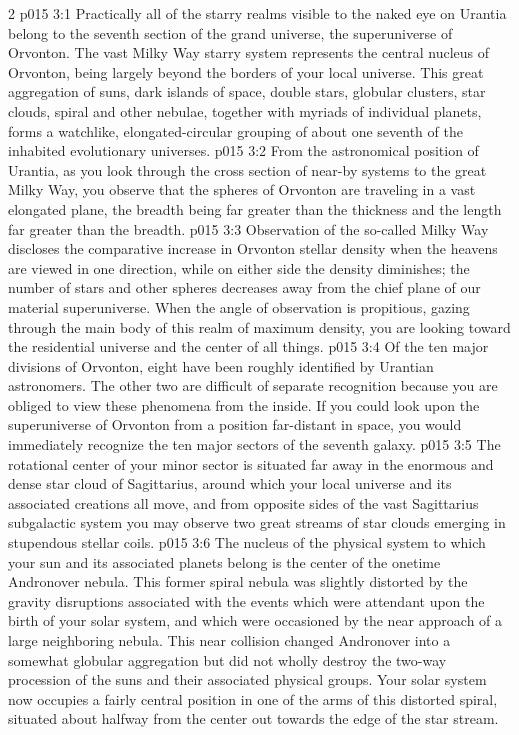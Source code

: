 \begin{multicols}{2}
\vs p015 3:1 Practically all of the starry realms visible to the naked eye on Urantia belong to the seventh section of the grand universe, the superuniverse of Orvonton. The vast Milky Way starry system represents the central nucleus of Orvonton, being largely beyond the borders of your local universe. This great aggregation of suns, dark islands of space, double stars, globular clusters, star clouds, spiral and other nebulae, together with myriads of individual planets, forms a watchlike, elongated\hyp{}circular grouping of about one seventh of the inhabited evolutionary universes.
\vs p015 3:2 From the astronomical position of Urantia, as you look through the cross section of near\hyp{}by systems to the great Milky Way, you observe that the spheres of Orvonton are traveling in a vast elongated plane, the breadth being far greater than the thickness and the length far greater than the breadth.
\vs p015 3:3 Observation of the so\hyp{}called Milky Way discloses the comparative increase in Orvonton stellar density when the heavens are viewed in one direction, while on either side the density diminishes; the number of stars and other spheres decreases away from the chief plane of our material superuniverse. When the angle of observation is propitious, gazing through the main body of this realm of maximum density, you are looking toward the residential universe and the center of all things.
\pc \vs p015 3:4 Of the ten major divisions of Orvonton, eight have been roughly identified by Urantian astronomers. The other two are difficult of separate recognition because you are obliged to view these phenomena from the inside. If you could look upon the superuniverse of Orvonton from a position far\hyp{}distant in space, you would immediately recognize the ten major sectors of the seventh galaxy.
\vs p015 3:5 The rotational center of your minor sector is situated far away in the enormous and dense star cloud of Sagittarius, around which your local universe and its associated creations all move, and from opposite sides of the vast Sagittarius subgalactic system you may observe two great streams of star clouds emerging in stupendous stellar coils.
\vs p015 3:6 The nucleus of the physical system to which your sun and its associated planets belong is the center of the onetime Andronover nebula. This former spiral nebula was slightly distorted by the gravity disruptions associated with the events which were attendant upon the birth of your solar system, and which were occasioned by the near approach of a large neighboring nebula. This near collision changed Andronover into a somewhat globular aggregation but did not wholly destroy the two\hyp{}way procession of the suns and their associated physical groups. Your solar system now occupies a fairly central position in one of the arms of this distorted spiral, situated about halfway from the center out towards the edge of the star stream.

\end{multicols}
